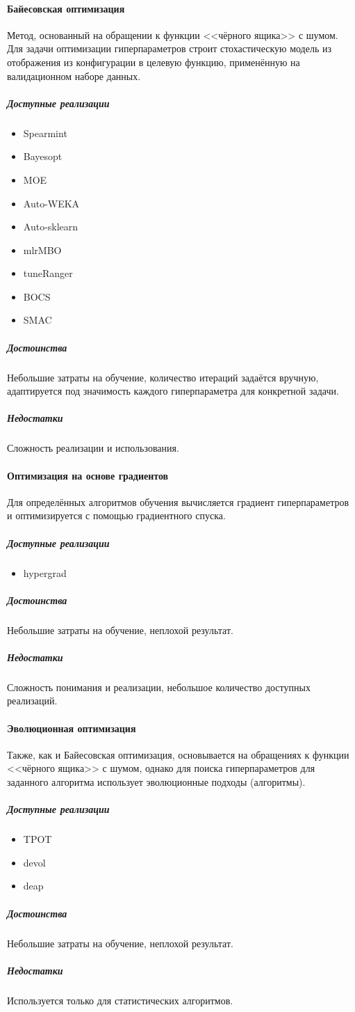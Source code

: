 \documentclass[times,specification,annotation]{itmo-student-thesis}
\begin{document}
	\paragraph{Байесовская оптимизация}\label{pr:bo} Метод, основанный на обращении к функции <<чёрного ящика>> с шумом. Для задачи оптимизации гиперпараметров строит стохастическую модель из отображения из конфигурации в целевую функцию, применённую на валидационном наборе данных.
		\subparagraph{Доступные реализации}
		\begin{itemize}
			\item Spearmint
			\item Bayesopt
			\item MOE
			\item Auto-WEKA
			\item Auto-sklearn
			\item mlrMBO
			\item tuneRanger
			\item BOCS
			\item SMAC
		\end{itemize}
		\subparagraph{Достоинства} Небольшие затраты на обучение, количество итераций задаётся вручную, адаптируется под значимость каждого гиперпараметра для конкретной задачи.
		\subparagraph{Недостатки} Сложность реализации и использования.
	\paragraph{Оптимизация на основе градиентов}  Для определённых алгоритмов обучения вычисляется градиент гиперпараметров и оптимизируется с помощью градиентного спуска.
		\subparagraph{Доступные реализации}
		\begin{itemize}
			\item hypergrad
		\end{itemize}
		\subparagraph{Достоинства} Небольшие затраты на обучение, неплохой результат.
		\subparagraph{Недостатки} Сложность понимания и реализации, небольшое количество доступных реализаций.
	\paragraph{Эволюционная оптимизация} Также, как и Байесовская оптимизация, основывается на обращениях к функции <<чёрного ящика>> с шумом, однако для поиска гиперпараметров для заданного алгоритма использует эволюционные подходы (алгоритмы)\cite{NIPS2011_4443}.
		\subparagraph{Доступные реализации}
		\begin{itemize}
			\item TPOT
			\item devol
			\item deap
		\end{itemize}
		\subparagraph{Достоинства} Небольшие затраты на обучение, неплохой результат.
		\subparagraph{Недостатки} Используется только для статистических алгоритмов. 
		
\end{document}
